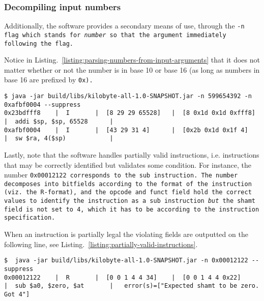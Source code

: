 \subsubsection{Decompiling input numbers}

Additionally, the software provides a secondary means of use, through
the \tt{-n} flag which stands for \emph{number} so that the argument
immediately following the flag.

Notice in Listing.~\ref{listing:parsing-numbers-from-input-arguments}
that it does not matter whether or not the number is in base 10 or
base 16 (as long as numbers in base 16 are prefixed by \tt{0x}).

\begin{landscape}
\thispagestyle{empty}
\begin{lstlisting}[style=plain,
    basicstyle=\small,
    caption=Parsing numbers from input arguments using the \tt{-n} flag,
    label=listing:parsing-numbers-from-input-arguments]
$ java -jar build/libs/kilobyte-all-1.0-SNAPSHOT.jar -n 599654392 -n 0xafbf0004 --suppress
0x23bdfff8    |  I       |  [8 29 29 65528]   |  [8 0x1d 0x1d 0xfff8]       |  addi $sp, $sp, 65528      |  
0xafbf0004    |  I       |  [43 29 31 4]      |  [0x2b 0x1d 0x1f 4]         |  sw $ra, 4($sp)            |
\end{lstlisting}
\end{landscape}

Lastly, note that the software handles partially valid instructions,
i.e. instructions that may be correctly identified but validates some
condition. For instance, the number \tt{0x00012122} corresponds to the
\tt{sub} instruction. The number decomposes into bitfields according
to the format of the instruction (viz. the R-format), and the opcode
and funct field hold the correct values to identify the instruction as
a \tt{sub} instruction \emph{but} the \tt{shamt} field is not set to
4, which it has to be according to the instruction specification.

When an instruction is partially legal the violating fields are outputted
on the following line, see Listing.~\ref{listing:partially-valid-instructions}.

\begin{landscape}
\thispagestyle{empty}
\begin{lstlisting}[basicstyle=\small,
    style=plain,
    caption=Error print-outs for partially valid instructions,
    label=listing:partially-valid-instructions,
  backgroundcolor=\color{mintedbackground}]
$  java -jar build/libs/kilobyte-all-1.0-SNAPSHOT.jar -n 0x00012122 --suppress
0x00012122    |  R       |  [0 0 1 4 4 34]    |  [0 0 1 4 4 0x22]           |  sub $a0, $zero, $at       |   error(s)=["Expected shamt to be zero. Got 4"]
\end{lstlisting}
\end{landscape}

